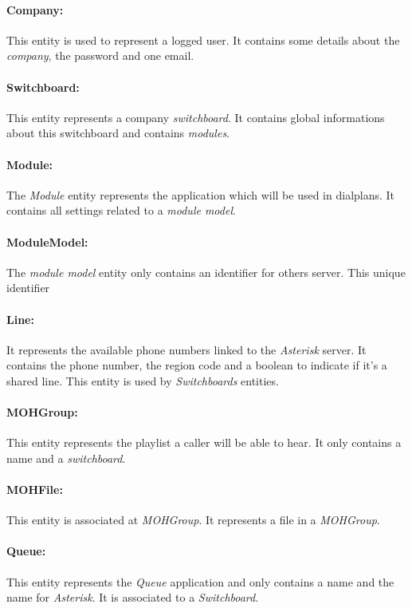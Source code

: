 \paragraph{Company:} 
This entity is used to represent a logged user. It contains some details about the \textit{company}, the password and one email.
 
\paragraph{Switchboard:}
This entity represents a company \textit{switchboard}. It contains global informations about this switchboard and contains \textit{modules}. 

\paragraph{Module:}
The \textit{Module} entity represents the application which will be used in dialplans. It contains all settings related to a \textit{module model}. 

\paragraph{ModuleModel:}
The \textit{module model} entity only contains an identifier for others server. This unique identifier 

\paragraph{Line:}
It represents the available phone numbers linked to the \textit{Asterisk} server. It contains the phone number, the region code and a boolean to indicate if it's a shared line. This entity is used by \textit{Switchboards} entities.

\paragraph{MOHGroup:}
This entity represents the playlist a caller will be able to hear. It only contains a name and a \textit{switchboard}.

\paragraph{MOHFile:}
This entity is associated at \textit{MOHGroup}. It represents a file in a \textit{MOHGroup}. 

\paragraph{Queue:}
This entity represents the \textit{Queue} application and only contains a name and the name for \textit{Asterisk}. It is associated to a \textit{Switchboard}.

